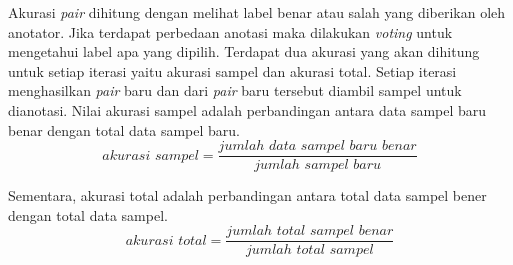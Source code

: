 Akurasi \textit{pair} dihitung dengan melihat label benar atau salah yang diberikan oleh anotator. Jika terdapat perbedaan anotasi maka dilakukan \textit{voting} untuk mengetahui label apa yang dipilih. Terdapat dua akurasi yang akan dihitung untuk setiap iterasi yaitu akurasi sampel dan akurasi total. Setiap iterasi menghasilkan \textit{pair} baru dan dari \textit{pair} baru tersebut diambil sampel untuk dianotasi. Nilai akurasi sampel adalah perbandingan antara data sampel baru benar dengan total data sampel baru. 
\begin{equation}
akurasi\,\,sampel = \frac{jumlah\,\,data\,\,sampel\,\,baru\,\,benar}{jumlah\,\,sampel\,\,baru}
\end{equation}

\noindent Sementara, akurasi total adalah perbandingan antara total data sampel bener dengan total data sampel.
\begin{equation}
akurasi\,\,total = \frac{jumlah\,\,total\,\,sampel\,\,benar}{jumlah\,\,total\,\,sampel}
\end{equation}
